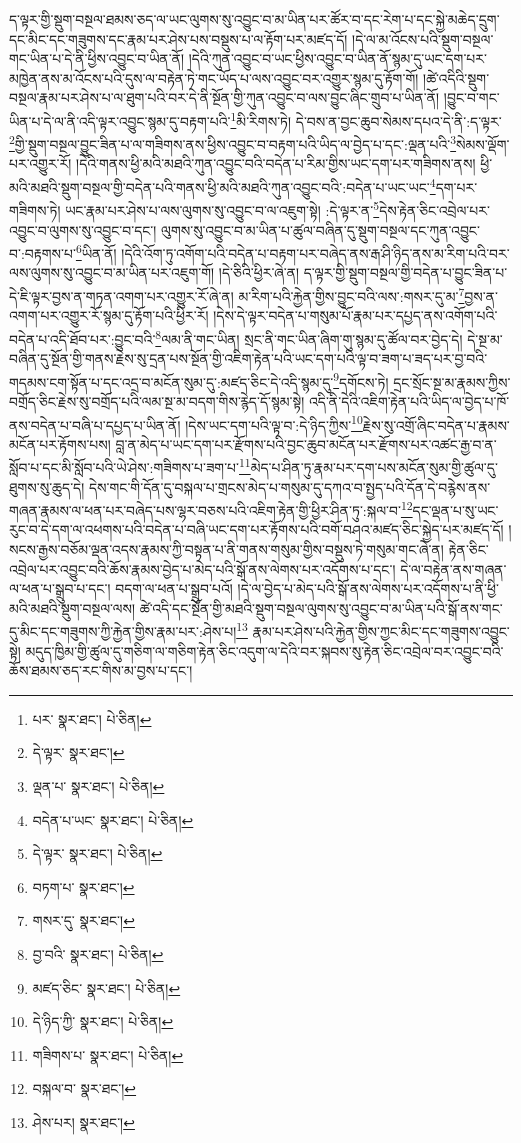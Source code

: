 ད་ལྟར་གྱི་སྡུག་བསྔལ་ཐམས་ཅད་ལ་ཡང་ལུགས་སུ་འབྱུང་བ་མ་ཡིན་པར་ཚོར་བ་དང་རེག་པ་དང་སྐྱེ་མཆེད་དྲུག་དང་མིང་དང་གཟུགས་དང་རྣམ་པར་ཤེས་པས་བསྡུས་པ་ལ་རྟོག་པར་མཛད་དོ། །དེ་ལ་མ་འོངས་པའི་སྡུག་བསྔལ་གང་ཡིན་པ་དེ་ནི་ཕྱིས་འབྱུང་བ་ཡིན་ནོ། །དེའི་ཀུན་འབྱུང་བ་ཡང་ཕྱིས་འབྱུང་བ་ཡིན་ནོ་སྙམ་དུ་ཡང་དག་པར་མཁྱེན་ནས་མ་འོངས་པའི་དུས་ལ་བརྟེན་ཏེ་གང་ཡོད་པ་ལས་འབྱུང་བར་འགྱུར་སྙམ་དུ་རྟོག་གོ། །ཚེ་འདིའི་སྡུག་བསྔལ་རྣམ་པར་ཤེས་པ་ལ་ཐུག་པའི་བར་དེ་ནི་སྔོན་གྱི་ཀུན་འབྱུང་བ་ལས་བྱུང་ཞིང་གྲུབ་པ་ཡིན་ནོ། །བྱུང་བ་གང་ཡིན་པ་དེ་ལ་ནི་འདི་ལྟར་འབྱུང་སྙམ་དུ་བརྟག་པའི་\footnote{པར་  སྣར་ཐང་།  པེ་ཅིན། }མི་རིགས་ཏེ། དེ་བས་ན་བྱང་ཆུབ་སེམས་དཔའ་དེ་ནི་:ད་ལྟར་\footnote{དེ་ལྟར་  སྣར་ཐང་། }གྱི་སྡུག་བསྔལ་བྱུང་ཟིན་པ་ལ་གཟིགས་ནས་ཕྱིས་འབྱུང་བ་བརྟག་པའི་ཡིད་ལ་བྱེད་པ་དང་:ལྡན་པའི་\footnote{ལྡན་པ་  སྣར་ཐང་།  པེ་ཅིན། }སེམས་ལྡོག་པར་འགྱུར་རོ། །དེའི་གནས་ཕྱི་མའི་མཐའི་ཀུན་འབྱུང་བའི་བདེན་པ་རིམ་གྱིས་ཡང་དག་པར་གཟིགས་ནས། ཕྱི་མའི་མཐའི་སྡུག་བསྔལ་གྱི་བདེན་པའི་གནས་ཕྱི་མའི་མཐའི་ཀུན་འབྱུང་བའི་:བདེན་པ་ཡང་ཡང་\footnote{བདེན་པ་ཡང་  སྣར་ཐང་།  པེ་ཅིན། }དག་པར་གཟིགས་ཏེ། ཡང་རྣམ་པར་ཤེས་པ་ལས་ལུགས་སུ་འབྱུང་བ་ལ་འཇུག་སྟེ། :དེ་ལྟར་ན་\footnote{དེ་ལྟར་  སྣར་ཐང་།  པེ་ཅིན། }དེས་རྟེན་ཅིང་འབྲེལ་པར་འབྱུང་བ་ལུགས་སུ་འབྱུང་བ་དང་། ལུགས་སུ་འབྱུང་བ་མ་ཡིན་པ་ཚུལ་བཞིན་དུ་སྡུག་བསྔལ་དང་ཀུན་འབྱུང་བ་:བརྟགས་པ་\footnote{བཏག་པ་  སྣར་ཐང་། }ཡིན་ནོ། །དེའི་འོག་ཏུ་འགོག་པའི་བདེན་པ་བརྟག་པར་བཞེད་ནས་རྒ་ཤི་ཉིད་ནས་མ་རིག་པའི་བར་ལས་ལུགས་སུ་འབྱུང་བ་མ་ཡིན་པར་འཇུག་གོ། །དེ་ཅིའི་ཕྱིར་ཞེ་ན། ད་ལྟར་གྱི་སྡུག་བསྔལ་གྱི་བདེན་པ་བྱུང་ཟིན་པ་དེ་ཇི་ལྟར་བྱས་ན་གཏན་འགག་པར་འགྱུར་རོ་ཞེ་ན། མ་རིག་པའི་རྐྱེན་གྱིས་བྱུང་བའི་ལས་:གསར་དུ་མ་\footnote{གསར་དུ་  སྣར་ཐང་། }བྱས་ན་འགག་པར་འགྱུར་རོ་སྙམ་དུ་རྟོག་པའི་ཕྱིར་རོ། །དེས་དེ་ལྟར་བདེན་པ་གསུམ་པོ་རྣམ་པར་དཔྱད་ནས་འགོག་པའི་བདེན་པ་འདི་ཐོབ་པར་:བྱུང་བའི་\footnote{བྱ་བའི་  སྣར་ཐང་།  པེ་ཅིན། }ལམ་ནི་གང་ཡིན། སྲང་ནི་གང་ཡིན་ཞིག་གུ་སྙམ་དུ་ཚོལ་བར་བྱེད་དེ། དེ་སྔ་མ་བཞིན་དུ་སྔོན་གྱི་གནས་རྗེས་སུ་དྲན་པས་སྔོན་གྱི་འཇིག་རྟེན་པའི་ཡང་དག་པའི་ལྟ་བ་ཟག་པ་ཟད་པར་བྱ་བའི་གདམས་ངག་སྟོན་པ་དང་འདྲ་བ་མངོན་སུམ་དུ་:མཛད་ཅིང་དེ་འདི་སྙམ་དུ་\footnote{མཛད་ཅིང་  སྣར་ཐང་།  པེ་ཅིན། }དགོངས་ཏེ། དྲང་སྲོང་སྔ་མ་རྣམས་ཀྱིས་བགྲོད་ཅིང་རྗེས་སུ་བགྲོད་པའི་ལམ་སྔ་མ་བདག་གིས་རྙེད་དོ་སྙམ་སྟེ། འདི་ནི་དེའི་འཇིག་རྟེན་པའི་ཡིད་ལ་བྱེད་པ་ཁོ་ནས་བདེན་པ་བཞི་པ་དཔྱད་པ་ཡིན་ནོ། །དེས་ཡང་དག་པའི་ལྟ་བ་:དེ་ཉིད་ཀྱིས་\footnote{དེ་ཉིད་ཀྱི་  སྣར་ཐང་།  པེ་ཅིན། }རྗེས་སུ་འགྲོ་ཞིང་བདེན་པ་རྣམས་མངོན་པར་རྟོགས་པས། བླ་ན་མེད་པ་ཡང་དག་པར་རྫོགས་པའི་བྱང་ཆུབ་མངོན་པར་རྫོགས་པར་འཚང་རྒྱ་བ་ན་སློབ་པ་དང་མི་སློབ་པའི་ཡེ་ཤེས་:གཟིགས་པ་ཟག་པ་\footnote{གཟིགས་པ་  སྣར་ཐང་།  པེ་ཅིན། }མེད་པ་ཤིན་ཏུ་རྣམ་པར་དག་པས་མངོན་སུམ་གྱི་ཚུལ་དུ་ཐུགས་སུ་ཆུད་དེ། དེས་གང་གི་དོན་དུ་བསྐལ་པ་གྲངས་མེད་པ་གསུམ་དུ་དཀའ་བ་སྤྱད་པའི་དོན་དེ་བརྙེས་ནས་གཞན་རྣམས་ལ་ཕན་པར་བཞེད་པས་ལྷར་བཅས་པའི་འཇིག་རྟེན་གྱི་ཕྱིར་ཤིན་ཏུ་:སྐལ་བ་\footnote{བསྐལ་བ་  སྣར་ཐང་། }དང་ལྡན་པ་སུ་ཡང་རུང་བ་དེ་དག་ལ་འཕགས་པའི་བདེན་པ་བཞི་ཡང་དག་པར་རྟོགས་པའི་བགོ་བཤའ་མཛད་ཅིང་སྐྱེད་པར་མཛད་དོ། །སངས་རྒྱས་བཅོམ་ལྡན་འདས་རྣམས་ཀྱི་བསྟན་པ་ནི་གནས་གསུམ་གྱིས་བསྡུས་ཏེ་གསུམ་གང་ཞེ་ན། རྟེན་ཅིང་འབྲེལ་པར་འབྱུང་བའི་ཆོས་རྣམས་བྱེད་པ་མེད་པའི་སྒོ་ནས་ལེགས་པར་འདོགས་པ་དང་། དེ་ལ་བརྟེན་ནས་གཞན་ལ་ཕན་པ་སྒྲུབ་པ་དང་། བདག་ལ་ཕན་པ་སྒྲུབ་པའོ། །དེ་ལ་བྱེད་པ་མེད་པའི་སྒོ་ནས་ལེགས་པར་འདོགས་པ་ནི་ཕྱི་མའི་མཐའི་སྡུག་བསྔལ་ལས། ཚེ་འདི་དང་སྔོན་གྱི་མཐའི་སྡུག་བསྔལ་ལུགས་སུ་འབྱུང་བ་མ་ཡིན་པའི་སྒོ་ནས་གང་དུ་མིང་དང་གཟུགས་ཀྱི་རྐྱེན་གྱིས་རྣམ་པར་:ཤེས་པ།\footnote{ཤེས་པར།  སྣར་ཐང་། } རྣམ་པར་ཤེས་པའི་རྐྱེན་གྱིས་ཀྱང་མིང་དང་གཟུགས་འབྱུང་སྟེ། མདུད་ཁྱིམ་གྱི་ཚུལ་དུ་གཅིག་ལ་གཅིག་རྟེན་ཅིང་འདུག་ལ་དེའི་བར་སྐབས་སུ་རྟེན་ཅིང་འབྲེལ་བར་འབྱུང་བའི་ཆོས་ཐམས་ཅད་རང་གིས་མ་བྱས་པ་དང་། 